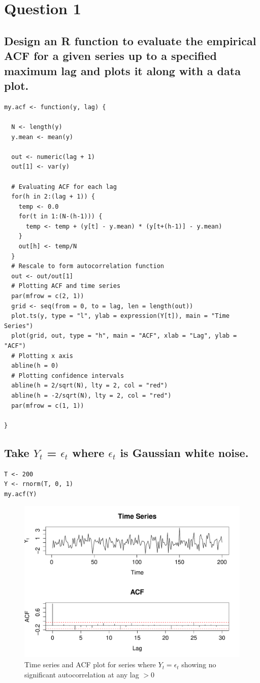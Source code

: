 \documentclass[10pt,a4paper]{article}
\let\Oldsubsection\subsection
\renewcommand{\subsection}{\FloatBarrier\Oldsubsection}
\begin{document}
\section{Question 1}
\subsection{Design an R function to evaluate the
empirical ACF for a given series up to a specified maximum lag and plots it along
with a data plot.}


\begin{lstlisting}
my.acf <- function(y, lag) {
  
  N <- length(y)
  y.mean <- mean(y)
  
  out <- numeric(lag + 1)
  out[1] <- var(y)
  
  # Evaluating ACF for each lag
  for(h in 2:(lag + 1)) {
    temp <- 0.0
    for(t in 1:(N-(h-1))) {
      temp <- temp + (y[t] - y.mean) * (y[t+(h-1)] - y.mean)
    }
    out[h] <- temp/N
  }
  # Rescale to form autocorrelation function
  out <- out/out[1]
  # Plotting ACF and time series
  par(mfrow = c(2, 1))
  grid <- seq(from = 0, to = lag, len = length(out))
  plot.ts(y, type = "l", ylab = expression(Y[t]), main = "Time Series")
  plot(grid, out, type = "h", main = "ACF", xlab = "Lag", ylab = "ACF")
  # Plotting x axis
  abline(h = 0)
  # Plotting confidence intervals
  abline(h = 2/sqrt(N), lty = 2, col = "red")
  abline(h = -2/sqrt(N), lty = 2, col = "red")
  par(mfrow = c(1, 1))
  
}
\end{lstlisting}


\subsection{Take $Y_t$ = $\epsilon_t$ where $\epsilon_t$
is Gaussian white noise.}
\begin{lstlisting}
T <- 200
Y <- rnorm(T, 0, 1)
my.acf(Y)
\end{lstlisting}


\begin{figure}[ht]
\includegraphics[width=\linewidth]{plots/p2.pdf}
\caption{Time series and ACF plot for series where $Y_t = \epsilon_t$ showing no significant autocorrelation at any lag $>0$}
\end{figure}
\end{document}
